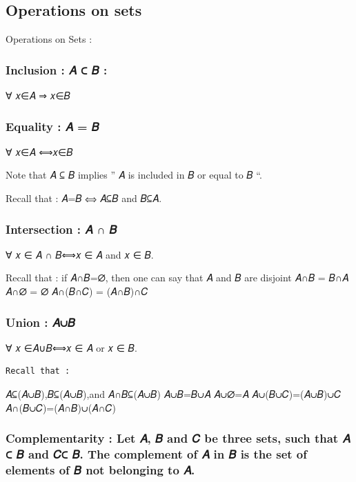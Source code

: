 \documentclass[
  letterpaper,
  DIV=11,
  numbers=noendperiod]{scrreprt}
\begin{document}
\subsection{Operations on sets}\label{operations-on-sets}

Operations on Sets :

\subsubsection{Inclusion : 𝐴 ⊂ 𝐵 :}\label{inclusion-ux1d434-ux1d435}

∀ 𝑥∈𝐴 ⇒ 𝑥∈𝐵

\subsubsection{Equality : 𝐴 = 𝐵}\label{equality-ux1d434-ux1d435}

∀ 𝑥∈𝐴 ⟺𝑥∈𝐵

Note that 𝐴 ⊆ 𝐵 implies '' 𝐴 is included in 𝐵 or equal to 𝐵 ``.

Recall that : 𝐴=𝐵 ⟺ 𝐴⊆𝐵 and 𝐵⊆𝐴.

\subsubsection{Intersection : 𝐴 ∩ 𝐵}\label{intersection-ux1d434-ux1d435}

∀ 𝑥 ∈ 𝐴 ∩ 𝐵⟺𝑥 ∈ 𝐴 and 𝑥 ∈ 𝐵.

Recall that : if 𝐴∩𝐵=∅, then one can say that 𝐴 and 𝐵 are disjoint 𝐴∩𝐵 =
𝐵∩𝐴 𝐴∩∅ = ∅ 𝐴∩(𝐵∩𝐶) = (𝐴∩𝐵)∩𝐶

\subsubsection{Union : 𝐴∪𝐵}\label{union-ux1d434ux1d435}

∀ 𝑥 ∈𝐴∪𝐵⟺𝑥 ∈ 𝐴 or 𝑥 ∈ 𝐵.

\begin{verbatim}
Recall that :
\end{verbatim}

𝐴⊆(𝐴∪𝐵),𝐵⊆(𝐴∪𝐵),and 𝐴∩𝐵⊆(𝐴∪𝐵) 𝐴∪𝐵=𝐵∪𝐴 𝐴∪∅=𝐴 𝐴∪(𝐵∪𝐶)=(𝐴∪𝐵)∪𝐶
𝐴∩(𝐵∪𝐶)=(𝐴∩𝐵)∪(𝐴∩𝐶)

\subsubsection{Complementarity : Let 𝐴, 𝐵 and 𝐶 be three sets, such that
𝐴 ⊂ 𝐵 and 𝐶⊂ 𝐵. The complement of 𝐴 in 𝐵 is the set of elements of 𝐵 not
belonging to
𝐴.}\label{complementarity-let-ux1d434-ux1d435-and-ux1d436-be-three-sets-such-that-ux1d434-ux1d435-and-ux1d436-ux1d435.-the-complement-of-ux1d434-in-ux1d435-is-the-set-of-elements-of-ux1d435-not-belonging-to-ux1d434.}
\end{document}
